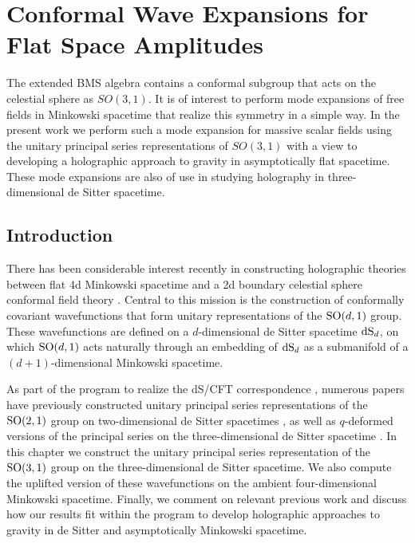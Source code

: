 \documentclass{brownthesis}
\begin{document}
\chapter{Conformal Wave Expansions for Flat Space Amplitudes}\label{chap:flatspace}
The extended BMS algebra contains a conformal subgroup that acts on
the celestial sphere as $SO(3,1)$. It is of interest to perform mode
expansions of free fields in Minkowski spacetime that realize this
symmetry in a simple way. In the present work we perform such a mode
expansion for massive scalar fields using the unitary principal series
representations of $SO(3,1)$ with a view to developing a holographic
approach to gravity in asymptotically flat spacetime. These mode expansions
are also of use in studying holography in three-dimensional de Sitter
spacetime.

\section{Introduction}

There has been considerable interest recently in constructing holographic
theories between flat 4d Minkowski spacetime and a 2d boundary celestial
sphere conformal field theory \cite{deBoer:2003vf,Kapec:2014opa,Kapec:2016jld,Cheung:2016iub}.
Central to this mission is the construction of conformally covariant
wavefunctions that form unitary representations of the ${\rm SO}(d,1)$
group. These wavefunctions are defined on a $d$-dimensional de Sitter
spacetime ${\rm dS}_{d}$, on which ${\rm SO}(d,1)$ acts naturally
through an embedding of ${\rm dS}_{d}$ as a submanifold of a $(d+1)$-dimensional
Minkowski spacetime.

As part of the program to realize the dS/CFT correspondence \cite{Strominger:2001pn},
numerous papers have previously constructed unitary principal series
representations of the ${\rm SO(2,1)}$ group on two-dimensional de
Sitter spacetimes \cite{Guijosa:2003ze,Guijosa:2005qi}, as well
as $q$-deformed versions of the principal series on the three-dimensional
de Sitter spacetime \cite{Lowe:2004nw}. In this chapter we construct
the unitary principal series representation of the ${\rm SO(3,1)}$
group on the three-dimensional de Sitter spacetime. We also compute
the uplifted version of these wavefunctions on the ambient four-dimensional
Minkowski spacetime. Finally, we comment on relevant previous work
\cite{Pasterski:2016qvg,Pasterski:2017kqt,Pasterski:2017ylz} and
discuss how our results fit within the program to develop holographic
approaches to gravity in de Sitter and asymptotically Minkowski spacetime.
\end{document}
